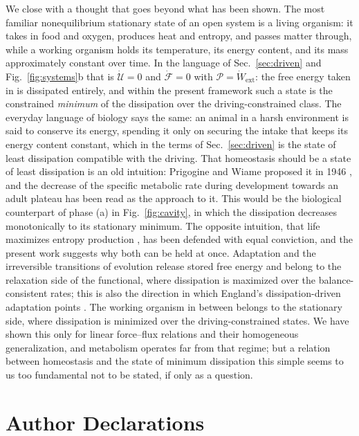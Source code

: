 \documentclass[aip,pof,reprint,amsmath,amssymb,longbibliography]{revtex4-2}
\begin{document}
We close with a thought that goes beyond what has been shown. The most familiar nonequilibrium stationary state of an open system is a living organism: it takes in food and oxygen, produces heat and entropy, and passes matter through, while a working organism holds its temperature, its energy content, and its mass approximately constant over time. In the language of Sec.~\ref{sec:driven} and Fig.~\ref{fig:systems}b that is $\dot{\mathcal{U}} = 0$ and $\dot{\mathcal{F}} = 0$ with $\mathcal{P} = \dot{W}_{\mathrm{ext}}$: the free energy taken in is dissipated entirely, and within the present framework such a state is the constrained \textit{minimum} of the dissipation over the driving-constrained class. The everyday language of biology says the same: an animal in a harsh environment is said to conserve its energy, spending it only on securing the intake that keeps its energy content constant, which in the terms of Sec.~\ref{sec:driven} is the state of least dissipation compatible with the driving. That homeostasis should be a state of least dissipation is an old intuition: Prigogine and Wiame proposed it in 1946 \cite{prigogine1946}, and the decrease of the specific metabolic rate during development towards an adult plateau \cite{zotin1967} has been read as the approach to it. This would be the biological counterpart of phase (a) in Fig.~\ref{fig:cavity}, in which the dissipation decreases monotonically to its stationary minimum. The opposite intuition, that life maximizes entropy production \cite{schneider1994, martyushev2006}, has been defended with equal conviction, and the present work suggests why both can be held at once. Adaptation and the irreversible transitions of evolution release stored free energy and belong to the relaxation side of the functional, where dissipation is maximized over the balance-consistent rates; this is also the direction in which England's dissipation-driven adaptation points \cite{england2013}. The working organism in between belongs to the stationary side, where dissipation is minimized over the driving-constrained states. We have shown this only for linear force--flux relations and their homogeneous generalization, and metabolism operates far from that regime; but a relation between homeostasis and the state of minimum dissipation this simple seems to us too fundamental not to be stated, if only as a question.



\section*{Author Declarations}
\end{document}
